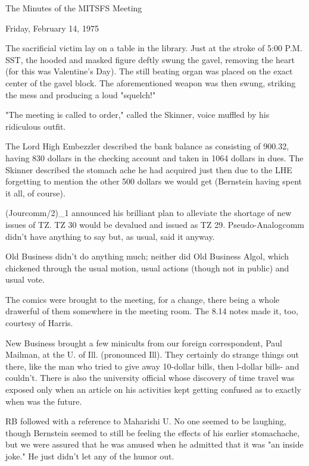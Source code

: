 \documentclass[12pt]{article}
\begin{document}
\begin{center}

The Minutes of the MITSFS Meeting

Friday, February 14, 1975

\end{center}
 
\vspace{12pt}

\setlength{\parskip}{6pt}

\noindent
The sacrificial victim lay on a table in the library. Just at the stroke of 5:00 P.M. SST, the hooded and masked figure deftly swung the gavel, removing the heart (for this was Valentine's Day). The still beating organ was placed on the exact center of the gavel block. The aforementioned weapon was then swung, striking the mess and producing a loud "squelch!"

"The meeting is called to order," called the Skinner, voice muffled by his ridiculous outfit.

The Lord High Embezzler described the bank balance as consisting of 900.32, having 830 dollars in the checking account and taken in 1064 dollars in dues. The Skinner described the stomach ache he had acquired just then due to the LHE forgetting to mention the other 500 dollars we would get (Bernstein having spent it all, of course).

(Jourcomm/2)_1 announced his brilliant plan to alleviate the shortage of new issues of TZ. TZ 30 would be devalued and issued as TZ 29. Pseudo-Analogcomm didn't have anything to say but, as usual, said it anyway.

Old Business didn't do anything much; neither did Old Business Algol, which chickened through the usual motion, usual actions (though not in public) and usual vote.

The comics were brought to the meeting, for a change, there being a whole drawerful of them somewhere in the meeting room. The 8.14 notes made it, too, courtesy of Harris.

New Business brought a few minicults from our foreign correspondent, Paul Mailman, at the U. of Ill. (pronounced Ill). They certainly do strange things out there, like the man who tried to give away 10-dollar bills, then l-dollar bills- and couldn't. There is also the university official whose discovery of time travel was exposed only when an article on his activities kept getting confused as to exactly when was the future.

RB followed with a reference to Maharishi U. No one seemed to be laughing, though Bernstein seemed to still be feeling the effects of his earlier stomachache, but we were assured that he was amused when he admitted that it was "an inside joke." He just didn't let any of the humor out.
\end{document}
